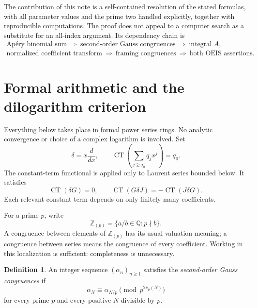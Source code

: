 \documentclass[11pt,letterpaper]{article}
\numberwithin{equation}{section}
\theoremstyle{definition}
\newtheorem{definition}[theorem]{Definition}
\newcommand{\Z}{\mathbb Z}
\newcommand{\Q}{\mathbb Q}
\newcommand{\Zp}{\Z_{(p)}}
\newcommand{\dd}{\delta}
\newcommand{\CT}{\operatorname{CT}}
\begin{document}
The contribution of this note is a self-contained resolution of the
stated formulas, with all parameter values and the prime two handled
explicitly, together with reproducible computations. The proof does not
appeal to a computer search as a substitute for an all-index argument.
Its dependency chain is
\[
\begin{gathered}
\text{Ap\'ery binomial sum}\ \Longrightarrow\
\text{second-order Gauss congruences}\ \Longrightarrow\
\text{integral }A,\\
\text{normalized coefficient transform}\ \Longrightarrow\
\text{framing congruences}\ \Longrightarrow\
\text{both OEIS assertions}.
\end{gathered}
\]

\section{Formal arithmetic and the dilogarithm criterion}\label{sec:arithmetic}

Everything below takes place in formal power series rings. No analytic
convergence or choice of a complex logarithm is involved. Set
\[
\dd=x\frac{d}{dx},\qquad
\CT\!\left(\sum_{j\geq j_0}q_jx^j\right)=q_0.
\]
The constant-term functional is applied only to Laurent series bounded
below. It satisfies
\begin{equation}\label{eq:ct-parts}
\CT(\dd G)=0,\qquad
\CT(G\dd J)=-\CT(J\dd G).
\end{equation}
Each relevant constant term depends on only finitely many coefficients.

For a prime $p$, write
\[
\Zp=\{a/b\in\Q:p\nmid b\}.
\]
A congruence between elements of $\Zp$ has its usual valuation meaning;
a congruence between series means the congruence of every coefficient.
Working in this localization is sufficient: completeness is unnecessary.

\begin{definition}\label{def:gauss}
An integer sequence $(\alpha_n)_{n\geq1}$ satisfies the
\emph{second-order Gauss congruences} if
\begin{equation}\label{eq:gauss-general}
\alpha_N\equiv\alpha_{N/p}\pmod{p^{2\nu_p(N)}}
\end{equation}
for every prime $p$ and every positive $N$ divisible by $p$.
\end{definition}
\end{document}
